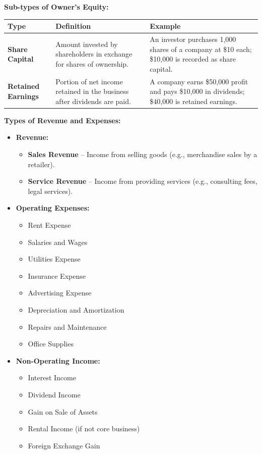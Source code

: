 \documentclass[12pt,a4paper]{book}
\begin{document}
\vspace{0.5cm}

\textbf{Sub-types of Owner’s Equity:}

\begin{tabular}{|p{4cm}|p{6cm}|p{6cm}|}
\hline
\textbf{Type} & \textbf{Definition} & \textbf{Example} \\
\hline
\textbf{Share Capital} & Amount invested by shareholders in exchange for shares of ownership. & An investor purchases 1,000 shares of a company at \$10 each; \$10,000 is recorded as share capital. \\
\hline
\textbf{Retained Earnings} & Portion of net income retained in the business after dividends are paid. & A company earns \$50,000 profit and pays \$10,000 in dividends; \$40,000 is retained earnings. \\
\hline
\end{tabular}

\vspace{0.5cm} 

\textbf{Types of Revenue and Expenses:}

\begin{itemize}
    \item \textbf{Revenue:}
    \begin{itemize}
        \item \textbf{Sales Revenue} – Income from selling goods (e.g., merchandise sales by a retailer).
        \item \textbf{Service Revenue} – Income from providing services (e.g., consulting fees, legal services).
    \end{itemize}

    \item \textbf{Operating Expenses:}
    \begin{itemize}
        \item Rent Expense
        \item Salaries and Wages
        \item Utilities Expense
        \item Insurance Expense
        \item Advertising Expense
        \item Depreciation and Amortization
        \item Repairs and Maintenance
        \item Office Supplies
    \end{itemize}

    \item \textbf{Non-Operating Income:}
    \begin{itemize}
        \item Interest Income
        \item Dividend Income
        \item Gain on Sale of Assets
        \item Rental Income (if not core business)
        \item Foreign Exchange Gain
    \end{itemize}
\end{itemize}
\end{document}
